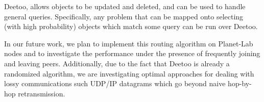 \documentclass[conference]{IEEEtran}
\begin{document}
Deetoo, allows objects to be updated and deleted, and can
be used to handle general queries.  Specifically, any problem
that can be mapped onto selecting (with high probability) objects
which match some query can be run over Deetoo.

In our future work, we plan to implement this routing algorithm
on Planet-Lab nodes and to investigate the performance under the presence
of frequently joining and leaving peers.  Additionally, due to the
fact that Deetoo is already a randomized algorithm, we are
investigating optimal approaches for dealing with lossy communications
such UDP/IP datagrams which go beyond naive hop-by-hop retransmission.



\end{document}
